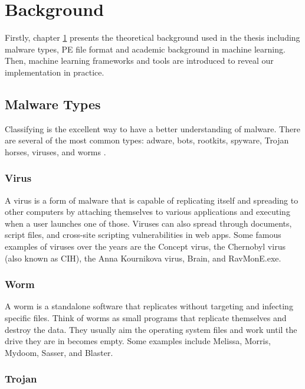 \chapter{Background}
\label{chap:background}
\graphicspath{{Chapter3/Figs/}}

\begin{chapabstract}
Firstly, chapter \ref{chap:background} presents the theoretical background used in the thesis including malware types, PE file format and academic background in machine learning. Then, machine learning frameworks and tools are introduced to reveal our implementation in practice.
\end{chapabstract}

\section{Malware Types}
\label{sec:malware}

Classifying is the excellent way to have a better understanding of malware. There are several of the most common types: adware, bots, rootkits, spyware, Trojan horses, viruses, and worms \cite{neil2012common}.

\subsection{Virus}

A virus is a form of malware that is capable of replicating itself and spreading to other computers by attaching themselves to various applications and executing when a user launches one of those. Viruses can also spread through documents, script files, and cross-site scripting vulnerabilities in web apps. Some famous examples of viruses over the years are the Concept virus, the Chernobyl virus (also known as CIH), the Anna Kournikova virus, Brain, and RavMonE.exe.

\subsection{Worm}

A worm is a standalone software that replicates without targeting and infecting specific files. Think of worms as small programs that replicate themselves and destroy the data. They usually aim the operating system files and work until the drive they are in becomes empty. Some examples include Melissa, Morris, Mydoom, Sasser, and Blaster.

\subsection{Trojan}

